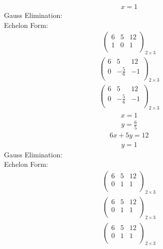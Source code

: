 \documentclass{article}
\begin{document}
\begin{align*}
x=1\end{align*}
Gauss Elimination:\\
Echelon Form:\\
\begin{align*}
\left(
\begin{array}{cc|c}
6 & 5 & 12\\
1 & 0 & 1\\
\end{array}
\right)_{2\times 3}
\end{align*}
\begin{align*}
\left(
\begin{array}{cc|c}
6 & 5 & 12\\
0 & -\frac{5}{6} & -1\\
\end{array}
\right)_{2\times 3}
\end{align*}
\begin{align*}
\left(
\begin{array}{cc|c}
6 & 5 & 12\\
0 & -\frac{5}{6} & -1\\
\end{array}
\right)_{2\times 3}
\end{align*}
\begin{align*}
x=1\end{align*}
\begin{align*}
y=\frac{6}{5}\end{align*}
\begin{align*}
6x + 5y=12\end{align*}
\begin{align*}
y=1\end{align*}
Gauss Elimination:\\
Echelon Form:\\
\begin{align*}
\left(
\begin{array}{cc|c}
6 & 5 & 12\\
0 & 1 & 1\\
\end{array}
\right)_{2\times 3}
\end{align*}
\begin{align*}
\left(
\begin{array}{cc|c}
6 & 5 & 12\\
0 & 1 & 1\\
\end{array}
\right)_{2\times 3}
\end{align*}
\begin{align*}
\left(
\begin{array}{cc|c}
6 & 5 & 12\\
0 & 1 & 1\\
\end{array}
\right)_{2\times 3}
\end{align*}
\end{document}

